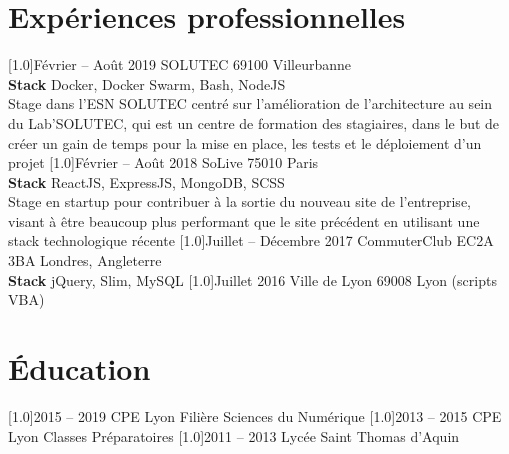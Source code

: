 \documentclass[french]{cv-style}          %
\begin{document}
\section{Expériences professionnelles}
\begin{entrylist}
\vspace{0.5cm}
\entry
  {\scalebox{.8}[1.0]{Février -- Août 2019}}
  {SOLUTEC}
  {69100 Villeurbanne}
  {\\
  \textbf{Stack} Docker, Docker Swarm, Bash, NodeJS\\
  Stage dans l'ESN SOLUTEC centré sur l'amélioration de l'architecture au sein du Lab'SOLUTEC, qui est un centre de formation des stagiaires,
  dans le but de créer un gain de temps pour la mise en place, les tests et le déploiement d'un projet}
\vspace{0.5cm}
\entry
  {\scalebox{.8}[1.0]{Février -- Août 2018}}
  {SoLive}
  {75010 Paris}
  {\\
  \textbf{Stack} ReactJS, ExpressJS, MongoDB, SCSS\\
  Stage en startup pour contribuer à la sortie du nouveau site de l'entreprise, visant à être beaucoup plus performant que le site précédent
  en utilisant une stack technologique récente}
\vspace{0.5cm}
\entry
  {\scalebox{.8}[1.0]{Juillet -- Décembre 2017}}
  {CommuterClub}
  {EC2A 3BA Londres, Angleterre}
  {\\
  \textbf{Stack} jQuery, Slim, MySQL}
\entry
  {\scalebox{.8}[1.0]{Juillet 2016}}
  {Ville de Lyon}
  {69008 Lyon}
  {(scripts VBA)}
 
\end{entrylist}

\section{Éducation}
\begin{entrylist}
\vspace{0.5cm}
\entry
  {\scalebox{.8}[1.0]{2015 -- 2019}}
  {CPE Lyon}
  {}
  {Filière Sciences du Numérique}
\vspace{0.5cm}
\entry
  {\scalebox{.8}[1.0]{2013 -- 2015}}
  {CPE Lyon}
  {}
  {Classes Préparatoires}
\entry
  {\scalebox{.8}[1.0]{2011 -- 2013}}
  {Lycée Saint Thomas d'Aquin}
  {}
  {}
 
\end{entrylist}
\end{document}
